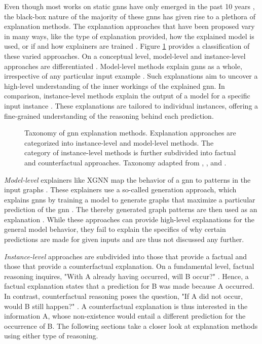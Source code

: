 Even though most works on static \glspl{gnn} have only emerged in the past 10 years \cite{wu_comprehensive_2021}, the black-box nature of the majority of these \glspl{gnn} has given rise to a plethora of explanation methods. The explanation approaches that have been proposed vary in many ways, like the type of explanation provided, how the explained model is used, or if and how explainers are trained \cite{kakkad_survey_2023}. Figure \ref{f_taxonomy_explainers} provides a classification of these varied approaches. On a conceptual level, model-level and instance-level approaches are differentiated \cite{yuan_explainability_2020}. Model-level methods explain \glspl{gnn} as a whole, irrespective of any particular input example \cite{yuan_explainability_2020}. Such explanations aim to uncover a high-level understanding of the inner workings of the explained \gls{gnn}. In comparison, instance-level methods explain the output of a model for a specific input instance \cite{yuan_explainability_2020}. These explanations are tailored to individual instances, offering a fine-grained understanding of the reasoning behind each prediction.

\begin{figure}[ht]
    \centering
    
    \caption{Taxonomy of \gls{gnn} explanation methods. Explanation approaches are categorized into instance-level and model-level methods. The category of instance-level methods is further subdivided into factual and counterfactual approaches. Taxonomy adapted from \cite{yuan_explainability_2020}, \cite{prado-romero_survey_2023}, and \cite{kakkad_survey_2023}.}
    \label{f_taxonomy_explainers}

\end{figure}

\textit{Model-level} explainers like XGNN \cite{yuan_xgnn_2020} map the behavior of a \gls{gnn} to patterns in the input graphs \cite{yuan_explainability_2020}. These explainers use a so-called generation approach, which explains \glspl{gnn} by training a model to generate graphs that maximize a particular prediction of the \gls{gnn} \cite{yuan_explainability_2020, yuan_xgnn_2020}. The thereby generated graph patterns are then used as an explanation \cite{yuan_xgnn_2020}. While these approaches can provide high-level explanations for the general model behavior, they fail to explain the specifics of why certain predictions are made for given inputs and are thus not discussed any further.

\textit{Instance-level} approaches are subdivided into those that provide a factual and those that provide a counterfactual explanation. On a fundamental level, factual reasoning inquires, "With A already having occurred, will B occur?" \cite{quelhas_relation_2018, tan_learning_2022}. Hence, a factual explanation states that a prediction for B was made because A occurred. In contrast, counterfactual reasoning poses the question, "If A did not occur, would B still happen?" \cite{quelhas_relation_2018, tan_learning_2022}. A counterfactual explanation is thus interested in the information A, whose non-existence would entail a different prediction for the occurrence of B. The following sections take a closer look at explanation methods using either type of reasoning.

